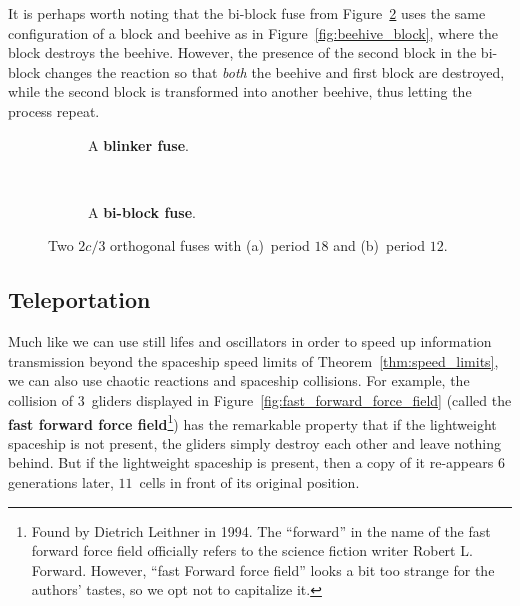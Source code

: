 It is perhaps worth noting that the bi-block fuse from Figure~\ref{fig:bi_block_fuse} uses the same configuration of a block and beehive as in Figure~\ref{fig:beehive_block}, where the block destroys the beehive. However, the presence of the second block in the bi-block changes the reaction so that \emph{both} the beehive and first block are destroyed, while the second block is transformed into another beehive, thus letting the process repeat.

\begin{figure}[!htb]
	\centering
	\begin{subfigure}{.48\textwidth}
		\centering{}
		\caption{A \textbf{blinker fuse}.}\label{fig:blinker_fuse}
	\end{subfigure} \ \ \ \ %
	\begin{subfigure}{.48\textwidth}
		\centering{}
		\caption{A \textbf{bi-block fuse}.}\label{fig:bi_block_fuse}
	\end{subfigure}
	\caption{Two $2c/3$ orthogonal fuses with (a)~period $18$ and (b)~period $12$.}\label{fig:useful_fuses}
\end{figure}


\subsection{Teleportation}\label{sec:teleportation}

Much like we can use still lifes and oscillators in order to speed up information transmission beyond the spaceship speed limits of Theorem~\ref{thm:speed_limits}, we can also use chaotic reactions and spaceship collisions. For example, the collision of $3$~gliders displayed in Figure~\ref{fig:fast_forward_force_field} (called the \textbf{fast forward force field}\footnote{Found by Dietrich Leithner in 1994. The ``forward'' in the name of the fast forward force field officially refers to the science fiction writer Robert L. Forward. However, ``fast Forward force field'' looks a bit too strange for the authors' tastes, so we opt not to capitalize it.}) has the remarkable property that if the lightweight spaceship is not present, the gliders simply destroy each other and leave nothing behind. But if the lightweight spaceship is present, then a copy of it re-appears $6$ generations later, $11$~cells in front of its original position.

